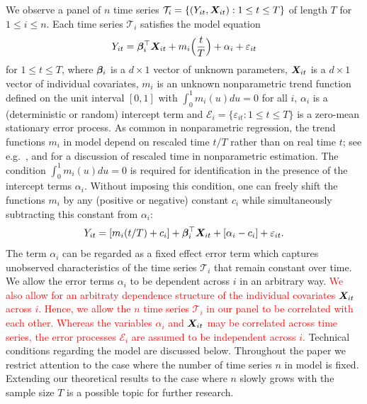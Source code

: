 \documentclass[a4paper,12pt]{article}
\makeatletter
\renewcommand{\eqref}[1]{\tagform@{\ref{#1}}}
\makeatother
\begin{document}
We observe a panel of $n$ time series $\mathcal{T}_i = \{(Y_{it}, \boldsymbol{X}_{it}): 1 \le t \le T \}$ of length $T$ for $1 \le i \le n$. Each time series $\mathcal{T}_i$ satisfies the model equation 
\begin{equation}\label{eq:model_full}
Y_{it} = \bm{\beta}^\top_i \boldsymbol{X}_{it} + m_i \Big( \frac{t}{T} \Big) + \alpha_i + \varepsilon_{it} 
\end{equation}
for $1 \le t \le T$, where $\bm{\beta}_i$ is a $d \times 1$ vector of unknown parameters, $\boldsymbol{X}_{it}$ is a $d\times 1$ vector of individual covariates, $m_i$ is an unknown nonparametric trend function defined on the unit interval $[0,1]$ with $\int_0^1 m_i(u) du = 0$ for all $i$, $\alpha_i$ is a (deterministic or random) intercept term and $\mathcal{E}_i = \{ \varepsilon_{it}: 1 \le t \le T \}$ is a zero-mean stationary error process. As common in nonparametric regression, the trend functions $m_i$ in model \eqref{eq:model_full} depend on rescaled time $t/T$ rather than on real time $t$; 
see e.g.\ \cite{Robinson1989}, \cite{Dahlhaus1997} and \cite{VogtLinton2014} for a discussion of rescaled time in nonparametric estimation. The condition $\int_0^1 m_i(u) du = 0$ is required for identification in the presence of the intercept terms $\alpha_i$. Without imposing this condition, one can freely shift the functions $m_i$ by any (positive or negative) constant $c_i$ while simultaneously subtracting this constant from $\alpha_i$:
\[ Y_{it} = [m_i(t/T) + c_i] + \bm{\beta}_i^\top \boldsymbol{X}_{it} + [\alpha_i - c_i] + \varepsilon_{it}. \]
The term $\alpha_i$ can be regarded as a fixed effect error term which captures unobserved characteristics of the time series $\mathcal{T}_i$ that remain constant over time. We allow the error terms $\alpha_i$ to be dependent across $i$ in an arbitrary way. \textcolor{red}{We also allow for an arbitraty dependence structure of the individual covariates $\boldsymbol{X}_{it}$ across $i$. Hence, %
we allow the $n$ time series $\mathcal{T}_i$ in our panel to be correlated with each other. Whereas the variables $\alpha_i$ and $\boldsymbol{X}_{it}$ may be correlated across time series, the error processes $\mathcal{E}_i$ are assumed to be independent across $i$.} Technical conditions regarding the model are discussed below. Throughout the paper we restrict attention to the case where the number of time series $n$ in model \eqref{eq:model_full} is fixed. Extending our theoretical results to the case where $n$ slowly grows with the sample size $T$ is a possible topic for further research.
\end{document}
